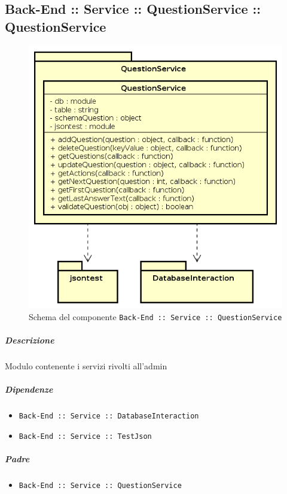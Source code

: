 \documentclass[../ManualeSviluppatore_v1.0.0.tex]{subfiles}
\begin{document}
\subsection{Back-End :: Service :: QuestionService :: QuestionService}
\begin{figure}[!h]
	\centering
	\includegraphics[scale=0.6]{Architettura/Back-End/Service/QuestionService.png}
	\caption{Schema del componente \texttt{Back-End :: Service :: QuestionService}}
\end{figure}
\subparagraph{Descrizione} Modulo contenente i servizi rivolti all'admin
\subparagraph{Dipendenze}
\begin{itemize}
	\item \texttt{Back-End :: Service :: DatabaseInteraction}
	\item \texttt{Back-End :: Service :: TestJson}
\end{itemize}
\subparagraph{Padre}
\begin{itemize}
	\item \texttt{Back-End :: Service :: QuestionService}
\end{itemize}
\end{document}
